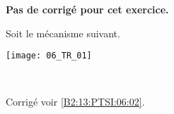 \normaltrue
\correctionfalse


\setcounter{numques}{0}
\ifcorrection
\else
\textbf{Pas de corrigé pour cet exercice.}
\fi

\ifprof
\else
Soit le mécanisme suivant. 
\begin{center}
\texttt{[image: 06\_TR\_01]}
\end{center}
\fi

\ifprof ~\\

\else
\fi

\ifprof
\else
\footnotesize

\normalsize
\begin{flushright}
\footnotesize{Corrigé  voir \ref{B2:13:PTSI:06:02}.}
\end{flushright}%
\fi